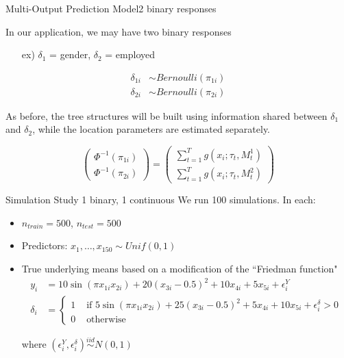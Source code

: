 \documentclass{beamer}
\begin{document}
\begin{frame}{Multi-Output Prediction Model}{2 binary responses}

In our application, we may have two binary responses
\begin{itemize}
\item[ex)] $\delta_1$ = gender, $\delta_2$ = employed
\end{itemize}


\begin{align}
\delta_{1i} &\sim Bernoulli(\pi_{1i}) \\
\delta_{2i} &\sim Bernoulli(\pi_{2i})
\end{align}

As before, the tree structures will be built using information shared between $\delta_1$ and $\delta_2$, while the location parameters are estimated separately. 

$$\begin{pmatrix}\Phi^{-1}(\pi_{1i}) \\ \Phi^{-1}(\pi_{2i}) \end{pmatrix} = 
\begin{pmatrix}\sum_{t=1}^T g(x_i ; \tau_t, M^{1}_t)\\%
\sum_{t=1}^T g(x_i ; \tau_t, M^{2}_t)%
\end{pmatrix} $$


\end{frame}


\begin{frame}{Simulation Study }{1 binary, 1 continuous}
We run 100 simulations. In each:
\begin{itemize}
\item $n_{train} = 500$, $n_{test} = 500$
\item Predictors: $x_1, \hdots, x_{150} \sim Unif(0,1)$
\item True underlying means based on a modification of the ``Friedman function"
\begin{align*}
y_i &= 10 \sin (\pi x_{1i} x_{2i}) + 20(x_{3i} - 0.5)^2 + 10x_{4i} + 5x_{5i} +
\epsilon_i^Y\\
\delta_i &= \begin{cases}1 &\text{ if }5 \sin (\pi x_{1i} x_{2i}) + 25(x_{3i} - 0.5)^2 + 5x_{4i} + 10x_{5i} +
\epsilon_i^{\delta} > 0 \\
                          0 & \text{ otherwise}\end{cases}
\end{align*}

where $(\epsilon_i^Y, \epsilon_i^{\delta}) \overset{iid}{\sim} N(0,1)$

\end{itemize}



\end{frame}
\end{document}
